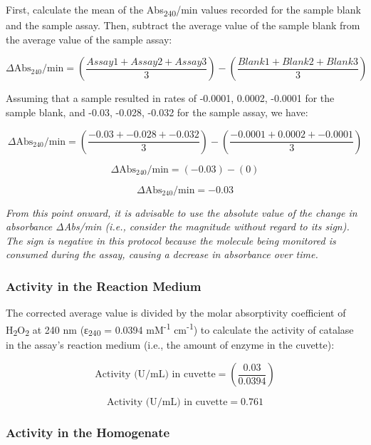 \documentclass[
  9pt,
  american,
  a5paper,
  extrafontsizes,onecolumn,openright
  ]{memoir}
\begin{document}
First, calculate the mean of the Abs\textsubscript{240}/min values recorded for the sample blank and the sample assay. Then, subtract the average value of the sample blank from the average value of the sample assay:

\[ \Delta \text{Abs}_{240}/\text{min} = \left( \frac{Assay 1 + Assay 2 + Assay 3}{3} \right) - \left( \frac{Blank 1 + Blank 2 + Blank 3}{3} \right)
\]

Assuming that a sample resulted in rates of -0.0001, 0.0002, -0.0001 for the sample blank, and -0.03, -0.028, -0.032 for the sample assay, we have:

\[ \Delta \text{Abs}_{240}/\text{min} = \left( \frac{-0.03 + -0.028 + -0.032}{3} \right) - \left( \frac{-0.0001 + 0.0002 + -0.0001}{3} \right)\]

\[ \Delta \text{Abs}_{240}/\text{min} = (-0.03) - (0)
\]

\[ \Delta \text{Abs}_{240}/\text{min} = -0.03
\]

\begin{greybox}[frametitle = Note]
\emph{From this point onward, it is advisable to use the absolute value of the change in absorbance ΔAbs/min (i.e., consider the magnitude without regard to its sign). The sign is negative in this protocol because the molecule being monitored is consumed during the assay, causing a decrease in absorbance over time.}

\end{greybox}

\subsubsection{Activity in the Reaction Medium}\label{activity-in-the-reaction-medium}

The corrected average value is divided by the molar absorptivity coefficient of H\textsubscript{2}O\textsubscript{2} at 240 nm (ε\textsubscript{240} = 0.0394 mM\textsuperscript{-1} cm\textsuperscript{-1}) to calculate the activity of catalase in the assay's reaction medium (i.e., the amount of enzyme in the cuvette):

\[ \text{Activity (U/mL) in cuvette} = \left( \frac{0.03}{0.0394} \right) \]

\[ \text{Activity (U/mL) in cuvette} = 0.761\]

\subsubsection{Activity in the Homogenate}\label{activity-in-the-homogenate}
\end{document}
